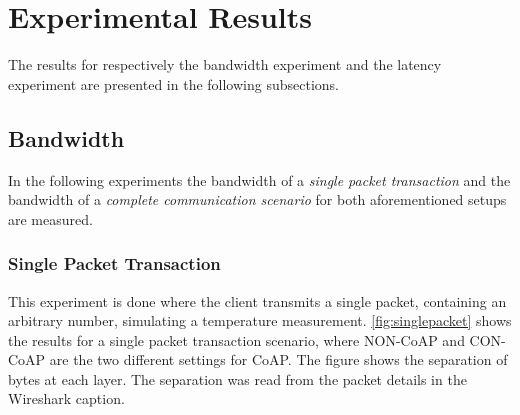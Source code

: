 \section{Experimental Results}\label{sec:experimentalresults}
The results for respectively the bandwidth experiment and the latency experiment are presented in the following subsections.

\subsection{Bandwidth}
In the following experiments the bandwidth of a \emph{single packet transaction} and the bandwidth of a \emph{complete communication scenario} for both aforementioned setups are measured. 

\subsubsection{Single Packet Transaction}
This experiment is done where the client transmits a single packet, containing an arbitrary number, simulating a temperature measurement. \figurename{\ref{fig:singlepacket}} shows the results for a single packet transaction scenario, where NON-CoAP and CON-CoAP are the two different settings for CoAP.
The figure shows the separation of bytes at each layer. The separation was read from the packet details in the Wireshark caption. 

